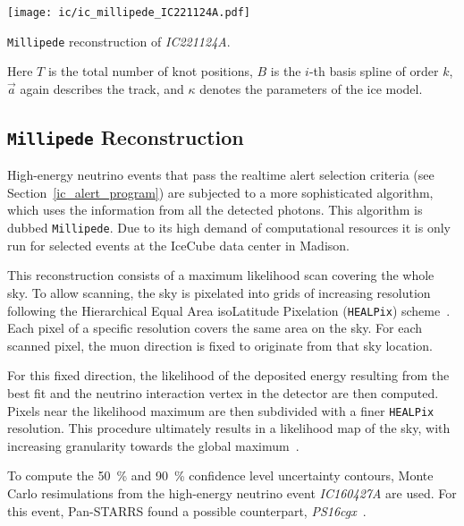 \begin{marginfigure}
    \texttt{[image: ic/ic\_millipede\_IC221124A.pdf]}
    \caption[\texttt{Millipede} reconstruction of \emph{IC221124A}]{\texttt{Millipede} reconstruction of \emph{IC221124A}.}
\end{marginfigure}

Here $T$ is the total number of knot positions, $B$ is the $i$-th basis spline of order $k$, $\vec{a}$ again describes the track, and $\kappa$ denotes the parameters of the ice model.

\subsection{\texttt{Millipede} Reconstruction}\label{millipede}

High-energy neutrino events that pass the realtime alert selection criteria (see Section~\ref{ic_alert_program}) are subjected to a more sophisticated algorithm, which uses the information from all the detected photons. This algorithm is dubbed \texttt{Millipede}. Due to its high demand of computational resources it is only run for selected events at the IceCube data center in Madison.

This reconstruction consists of a maximum likelihood scan covering the whole sky. To allow scanning, the sky is pixelated into grids of increasing resolution following the Hierarchical Equal Area isoLatitude Pixelation (\texttt{HEALPix}) scheme~. Each pixel of a specific resolution covers the same area on the sky. For each scanned pixel, the muon direction is fixed to originate from that sky location.

For this fixed direction, the likelihood of the deposited energy resulting from the best fit and the neutrino interaction vertex in the detector are then computed. Pixels near the likelihood maximum are then subdivided with a finer \texttt{HEALPix} resolution. This procedure ultimately results in a likelihood map of the sky, with increasing granularity towards the global maximum~.

To compute the \SI{50}{\percent} and \SI{90}{\percent} confidence level uncertainty contours, Monte Carlo resimulations from the high-energy neutrino event \emph{IC160427A} are used. For this event, Pan-STARRS found a possible counterpart, \emph{PS16cgx}~.

